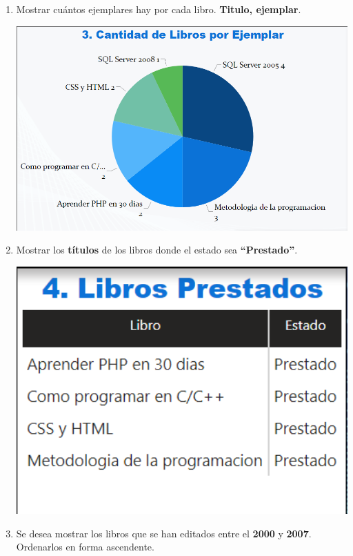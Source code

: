\documentclass{article}
\begin{document}
\begin{enumerate}[\tab 1.]
\begin{center}
        \end{center}
        \newpage
        \item Mostrar cuántos ejemplares hay por cada libro. \textbf{Titulo, ejemplar}.
        \begin{center}
            \includegraphics[width=13cm]{./images/15.png}
        \end{center}
        \newpage
        \item Mostrar los \textbf{títulos} de los libros donde el estado sea \textbf{“Prestado”}.
        \begin{center}
            \includegraphics[width=13cm]{./images/16.png}
        \end{center}
        \newpage
        \item Se desea mostrar los libros que se han editados entre el \textbf{2000} y \textbf{2007}. Ordenarlos en forma ascendente.
        \begin{center}

\end{center}
\end{enumerate}
\end{document}
